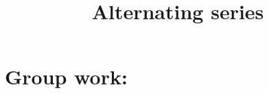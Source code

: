 \documentclass[]{ximera}
\title{Alternating series}
\begin{document}
\begin{abstract}		\end{abstract}
\maketitle



\begin{comment}
\section{Warm up:}

	\begin{freeResponse}
	
	\end{freeResponse}
	
\begin{instructorNotes}

\end{instructorNotes}
\end{comment}







\section{Group work:}
\end{document}

